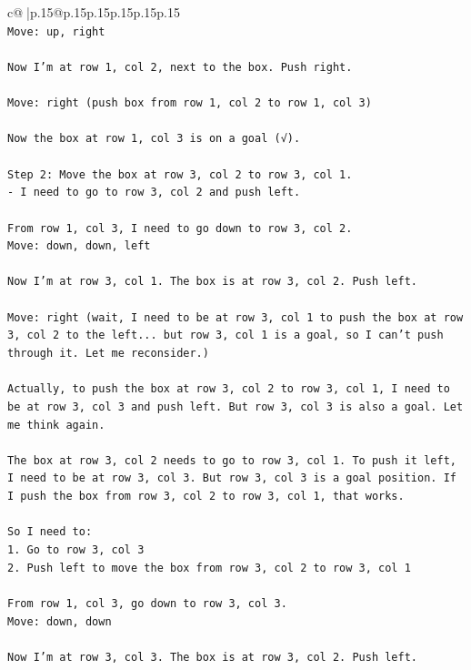 \documentclass{article}
\begin{document}
{\begin{supertabular}{c@{$\;$}|p{.15\linewidth}@{}p{.15\linewidth}p{.15\linewidth}p{.15\linewidth}p{.15\linewidth}p{.15\linewidth}}
{{{\\ 
\texttt{Move: up, right} \\
\\ 
\texttt{Now I'm at row 1, col 2, next to the box. Push right.} \\
\\ 
\texttt{Move: right (push box from row 1, col 2 to row 1, col 3)} \\
\\ 
\texttt{Now the box at row 1, col 3 is on a goal (√).} \\
\\ 
\texttt{Step 2: Move the box at row 3, col 2 to row 3, col 1.} \\
\texttt{{-} I need to go to row 3, col 2 and push left.} \\
\\ 
\texttt{From row 1, col 3, I need to go down to row 3, col 2.} \\
\texttt{Move: down, down, left} \\
\\ 
\texttt{Now I'm at row 3, col 1. The box is at row 3, col 2. Push left.} \\
\\ 
\texttt{Move: right (wait, I need to be at row 3, col 1 to push the box at row 3, col 2 to the left... but row 3, col 1 is a goal, so I can't push through it. Let me reconsider.)} \\
\\ 
\texttt{Actually, to push the box at row 3, col 2 to row 3, col 1, I need to be at row 3, col 3 and push left. But row 3, col 3 is also a goal. Let me think again.} \\
\\ 
\texttt{The box at row 3, col 2 needs to go to row 3, col 1. To push it left, I need to be at row 3, col 3. But row 3, col 3 is a goal position. If I push the box from row 3, col 2 to row 3, col 1, that works.} \\
\\ 
\texttt{So I need to:} \\
\texttt{1. Go to row 3, col 3} \\
\texttt{2. Push left to move the box from row 3, col 2 to row 3, col 1} \\
\\ 
\texttt{From row 1, col 3, go down to row 3, col 3.} \\
\texttt{Move: down, down} \\
\\ 
\texttt{Now I'm at row 3, col 3. The box is at row 3, col 2. Push left.} \\
}}}
\end{supertabular}}
\end{document}
